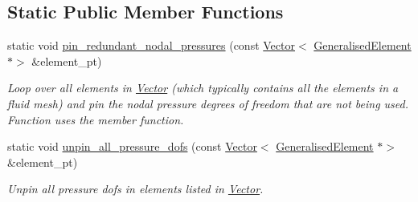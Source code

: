 \subsection*{Static Public Member Functions}
\begin{DoxyCompactItemize}
\item 
static void \hyperlink{classoomph_1_1RefineableLinearisedAxisymmetricNavierStokesEquations_ac51e936ed49a6cc6a86119730bb78cd1}{pin\+\_\+redundant\+\_\+nodal\+\_\+pressures} (const \hyperlink{classoomph_1_1Vector}{Vector}$<$ \hyperlink{classoomph_1_1GeneralisedElement}{Generalised\+Element} $\ast$$>$ \&element\+\_\+pt)
\begin{DoxyCompactList}\small\item\em Loop over all elements in \hyperlink{classoomph_1_1Vector}{Vector} (which typically contains all the elements in a fluid mesh) and pin the nodal pressure degrees of freedom that are not being used. Function uses the member function. \end{DoxyCompactList}\item 
static void \hyperlink{classoomph_1_1RefineableLinearisedAxisymmetricNavierStokesEquations_ab836fb5486bd541fd1eb7759b04f90cc}{unpin\+\_\+all\+\_\+pressure\+\_\+dofs} (const \hyperlink{classoomph_1_1Vector}{Vector}$<$ \hyperlink{classoomph_1_1GeneralisedElement}{Generalised\+Element} $\ast$$>$ \&element\+\_\+pt)
\begin{DoxyCompactList}\small\item\em Unpin all pressure dofs in elements listed in \hyperlink{classoomph_1_1Vector}{Vector}. \end{DoxyCompactList}\end{DoxyCompactItemize}
